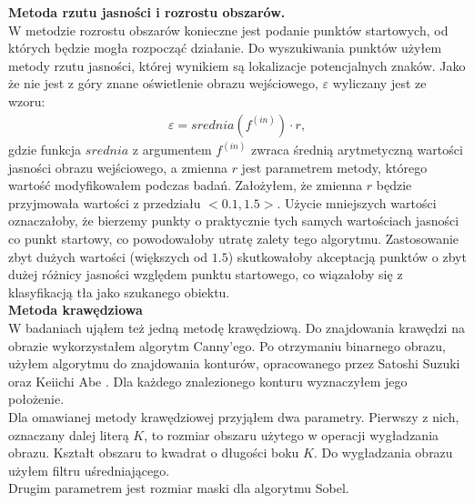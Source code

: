 \textbf{Metoda rzutu jasności i rozrostu obszarów.}\\
W metodzie rozrostu obszarów konieczne jest podanie punktów startowych, od których będzie mogła rozpocząć działanie. Do wyszukiwania punktów użyłem metody rzutu jasności, której wynikiem są lokalizacje potencjalnych znaków. Jako że nie jest z góry znane oświetlenie obrazu wejściowego, $\varepsilon$ wyliczany jest ze wzoru:
\begin{gather*}
  \varepsilon = srednia(f^{(in)}) \cdot r,
\end{gather*}
gdzie funkcja $srednia$ z argumentem $f^{(in)}$ zwraca średnią arytmetyczną wartości jasności obrazu wejściowego, a zmienna $r$ jest parametrem metody, którego wartość modyfikowałem podczas badań. Założyłem, że zmienna $r$ będzie przyjmowała wartości z przedziału $\big<0.1, 1.5\big>$. Użycie mniejszych wartości oznaczałoby, że bierzemy punkty o praktycznie tych samych wartościach jasności co punkt startowy, co powodowałoby utratę zalety tego algorytmu. Zastosowanie zbyt dużych wartości (większych od $1.5$) skutkowałoby akceptacją punktów o zbyt dużej różnicy jasności względem punktu startowego, co wiązałoby się z klasyfikacją tła jako szukanego obiektu.  \\

\textbf{Metoda krawędziowa}\\
W badaniach ująłem też jedną metodę krawędziową. Do znajdowania krawędzi na obrazie wykorzystałem algorytm Canny'ego. Po otrzymaniu binarnego obrazu, użyłem algorytmu do znajdowania konturów, opracowanego przez Satoshi Suzuki oraz Keiichi Abe \cite{suzuki85}. Dla każdego znalezionego konturu wyznaczyłem jego położenie.\\
Dla omawianej metody krawędziowej przyjąłem dwa parametry. Pierwszy z nich, oznaczany dalej literą $K$, to rozmiar obszaru użytego w operacji wygładzania obrazu. Kształt obszaru to kwadrat o długości boku $K$. Do wygładzania obrazu użyłem filtru uśredniającego. \\
Drugim parametrem jest rozmiar maski dla algorytmu Sobel.
